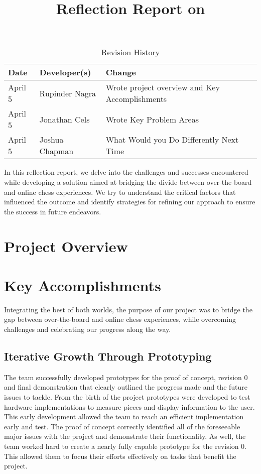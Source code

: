 \documentclass{article}
\title{Reflection Report on \progname}
\author{\authname}
\date{}
\begin{document}
\begin{table}[hp]
\caption{Revision History} \label{TblRevisionHistory}
\begin{tabularx}{\textwidth}{llX}
\toprule
\textbf{Date} & \textbf{Developer(s)} & \textbf{Change}\\
\midrule
April 5 & Rupinder Nagra & Wrote project overview and Key Accomplishments\\
April 5 & Jonathan Cels & Wrote Key Problem Areas\\
April 5 & Joshua Chapman & What Would you Do Differently Next Time\\
\bottomrule
\end{tabularx}
\end{table}

\newpage

\maketitle

In this reflection report, we delve into the challenges and successes encountered while developing a solution aimed at bridging the divide between over-the-board and online chess experiences. We try to understand the critical factors that influenced the outcome and identify strategies for refining our approach to ensure the success in future endeavors.

\section{Project Overview}
\projectoverview

\section{Key Accomplishments}

Integrating the best of both worlds, the purpose of our project was to bridge the gap between over-the-board and online chess experiences, while overcoming challenges and celebrating our progress along the way.

\subsection{Iterative Growth Through Prototyping}
The team successfully developed prototypes for the proof of concept, revision 0 and final 
demonstration that clearly outlined the progress made and the future issues to tackle. From 
the birth of the project prototypes were developed to test hardware implementations to measure
pieces and display information to the user. This early development allowed the team to reach 
an efficient implementation early and test. The proof of concept correctly identified all of 
the foreseeable major issues with the project and demonstrate their functionality. As well, 
the team worked hard to create a nearly fully capable prototype for the revision 0. This allowed
them to focus their efforts effectively on tasks that benefit the project. 
\end{document}
